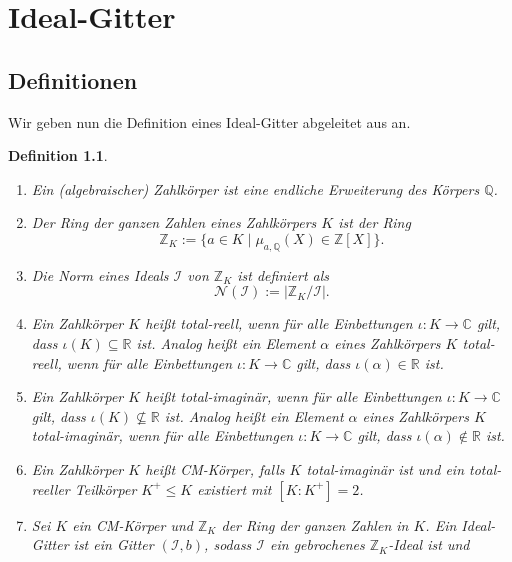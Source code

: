\documentclass[12pt,a4paper,halfparskip,headsepline,bibtotocnumbered]{scrreprt}
\theoremstyle{nummermitklammern}
\newtheorem{definition}[defsatzusw]{Definition}
\theoremstyle{nonumberbreak}
\newcommand{\Z}{\mathbb{Z}}
\newcommand{\Q}{\mathbb{Q}}
\newcommand{\R}{\mathbb{R}}
\newcommand{\C}{\mathbb{C}}
\newcommand{\No}{\mathcal{N}}
\newcommand{\I}{\mathcal{I}}
\begin{document}
\chapter{Ideal-Gitter}

\section{Definitionen}

Wir geben nun die Definition eines Ideal-Gitter abgeleitet aus \cite{fluckiger} an.

\begin{framed}
	\begin{definition}
		\begin{enumerate}[label=(\roman*)]
			\item Ein \textit{(algebraischer) Zahlkörper} ist eine endliche Erweiterung des Körpers $\Q$.
			\item Der \textit{Ring der ganzen Zahlen} eines Zahlkörpers $K$ ist der Ring
				\begin{equation*}
					\Z_K := \lbrace a \in K \mid \mu_{a, \Q}(X) \in \Z\left[X\right] \rbrace.
				\end{equation*}
			\item Die \textit{Norm} eines Ideals $\I$ von $\Z_K$ ist definiert als
				\begin{equation*}
					\No(\I) := \vert \Z_K / \I \vert.
				\end{equation*}
			\item Ein Zahlkörper $K$ heißt \textit{total-reell}, wenn für alle Einbettungen $\iota : K \rightarrow \C$ gilt, dass $\iota(K) \subseteq \R$ ist. Analog heißt ein Element $\alpha$ eines Zahlkörpers $K$ total-reell, wenn für alle Einbettungen $\iota : K \rightarrow \C$ gilt, dass $\iota(\alpha) \in \R$ ist.
			\item Ein Zahlkörper $K$ heißt \textit{total-imaginär}, wenn für alle Einbettungen $\iota : K \rightarrow \C$ gilt, dass $\iota(K) \not\subseteq \R$ ist. Analog heißt ein Element $\alpha$ eines Zahlkörpers $K$ total-imaginär, wenn für alle Einbettungen $\iota : K \rightarrow \C$ gilt, dass $\iota(\alpha) \not\in \R$ ist.
			\item Ein Zahlkörper $K$ heißt \textit{CM-Körper}, falls $K$ total-imaginär ist und ein total-reeller Teilkörper $K^+ \leq K$ existiert mit $\left[ K : K^+ \right] = 2$. 
			\item Sei $K$ ein CM-Körper und $\Z_K$ der Ring der ganzen Zahlen in $K$. Ein \textit{Ideal-Gitter} ist ein Gitter $(\I,b)$, sodass $\I$ ein gebrochenes $\Z_K$-Ideal ist und\linebreak

\end{enumerate}
\end{definition}
\end{framed}
\end{document}
